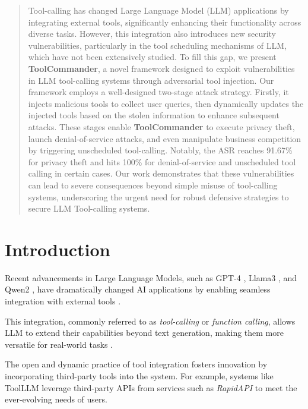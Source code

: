 \begin{abstract}
Tool-calling has changed Large Language Model (LLM) applications by integrating external tools, significantly enhancing their functionality across diverse tasks. However, this integration also introduces new security vulnerabilities, particularly in the tool scheduling mechanisms of LLM, which have not been extensively studied. To fill this gap, we present \textbf{ToolCommander}, a novel framework designed to exploit vulnerabilities in LLM tool-calling systems through adversarial tool injection. Our framework employs a well-designed two-stage attack strategy. Firstly, it injects malicious tools to collect user queries, then dynamically updates the injected tools based on the stolen information to enhance subsequent attacks. These stages enable \textbf{ToolCommander} to execute privacy theft, launch denial-of-service attacks, and even manipulate business competition by triggering unscheduled tool-calling. Notably, the ASR reaches 91.67\% for privacy theft and hits 100\% for denial-of-service and unscheduled tool calling in certain cases. Our work demonstrates that these vulnerabilities can lead to severe consequences beyond simple misuse of tool-calling systems, underscoring the urgent need for robust defensive strategies to secure LLM Tool-calling systems.
\end{abstract}

\section{Introduction}

Recent advancements in Large Language Models, such as GPT-4 \cite{achiam2023gpt}, Llama3 \cite{dubey2024llama}, and Qwen2 \cite{yang2024qwen2}, have dramatically changed AI applications by enabling seamless integration with external tools \cite{tang2023toolalpaca, qin2023toolllm}. 

This integration, commonly referred to as \textit{tool-calling} or \textit{function calling}, allows LLM to extend their capabilities beyond text generation, making them more versatile for real-world tasks \cite{jana2023cotran, zhao2024let, nakano2021webgpt, shen2024hugginggpt}. 

The open and dynamic practice of tool integration fosters innovation by incorporating third-party tools into the system. For example, systems like ToolLLM \cite{qin2023toolllm} leverage third-party APIs from services such as \textit{RapidAPI} \cite{rapidapi} to meet the ever-evolving needs of users. 

